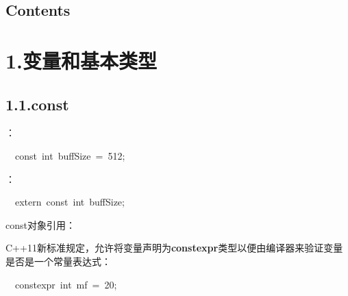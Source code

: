 \documentclass{article}
\begin{document}
{\mdline{}
\begin{mdtoc}%

\section*{Contents}\label{sec-contents}%

\begin{mdtocblock}%


\begin{mdtocblock}%


\end{mdtocblock}%
\end{mdtocblock}%
\end{mdtoc}%

\mdxtitleblockstart{}
\mdxauthorstart{}
\mdxauthorend\mdtitleauthorrunning{}{}\mdxtitleblockend%

\section{1.\hspace*{0.5em}变量和基本类型}\label{section}%

\subsection{1.1.\hspace*{0.5em}const}\label{sec-const}%

：%
\begin{mdpre}%
\noindent~~{const}~{int}~buffSize~=~{512};%
\end{mdpre}：
\begin{mdpre}%
\noindent~~{extern}~{const}~{int}~buffSize;%
\end{mdpre}\noindent const对象引用：

C++11新标准规定，允许将变量声明为\textbf{constexpr}类型以便由编译器来验证变量是否是一个常量表达式：%
\begin{mdpre}%
\noindent~~{constexpr}~{int}~mf~=~{20};%
\end{mdpre}
}
\end{document}
